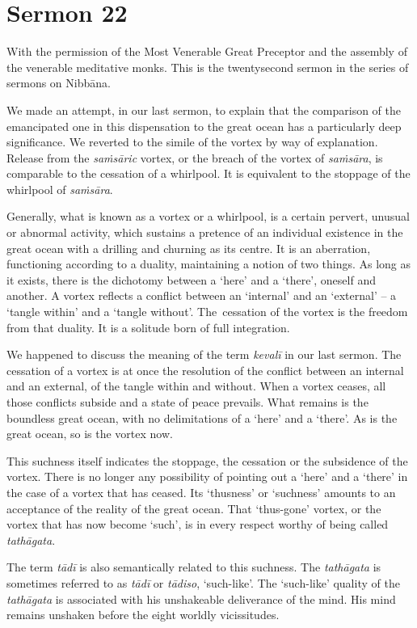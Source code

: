 \chapter{Sermon 22}

\NibbanaOpeningQuote

With the permission of the Most Venerable Great Preceptor and the assembly of the venerable meditative monks. This is the twentysecond sermon in the series of sermons on Nibbāna.

We made an attempt, in our last sermon, to explain that the comparison of the emancipated one in this dispensation to the great ocean has a particularly deep significance. We reverted to the simile of the vortex by way of explanation. Release from the \emph{saṁsāric} vortex, or the breach of the vortex of \emph{saṁsāra}, is comparable to the cessation of a whirlpool. It is equivalent to the stoppage of the whirlpool of \emph{saṁsāra}.

Generally, what is known as a vortex or a whirlpool, is a certain pervert, unusual or abnormal activity, which sustains a pretence of an individual existence in the great ocean with a drilling and churning as its centre. It is an aberration, functioning according to a duality, maintaining a notion of two things. As long as it exists, there is the dichotomy between a `here' and a `there', oneself and another. A vortex reflects a conflict between an `internal' and an `external' -- a `tangle within' and a `tangle without'. The~cessation of the vortex is the freedom from that duality. It is a solitude born of full integration.

We happened to discuss the meaning of the term \emph{kevalī} in our last sermon. The cessation of a vortex is at once the resolution of the conflict between an internal and an external, of the tangle within and without. When a vortex ceases, all those conflicts subside and a state of peace prevails. What remains is the boundless great ocean, with no delimitations of a `here' and a `there'. As is the great ocean, so is the vortex now.

This suchness itself indicates the stoppage, the cessation or the subsidence of the vortex. There is no longer any possibility of pointing out a `here' and a `there' in the case of a vortex that has ceased. Its `thusness' or `suchness' amounts to an acceptance of the reality of the great ocean. That `thus-gone' vortex, or the vortex that has now become `such', is in every respect worthy of being called \emph{tathāgata}.

The term \emph{tādī} is also semantically related to this suchness. The \emph{tathāgata} is sometimes referred to as \emph{tādī} or \emph{tādiso}, `such-like'. The `such-like' quality of the \emph{tathāgata} is associated with his unshakeable deliverance of the mind. His mind remains unshaken before the eight worldly vicissitudes.

